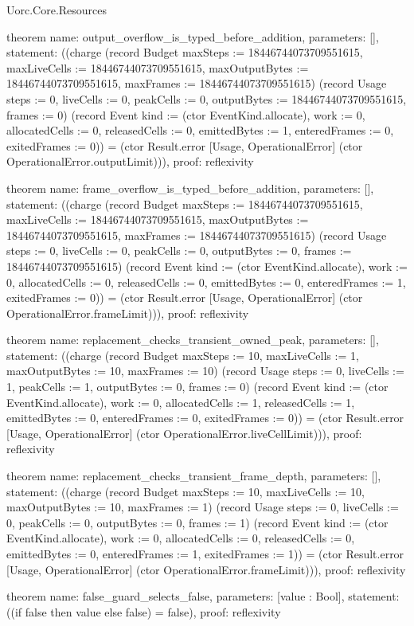 \begin{lexlean}{Uorc.Core.Resources}
\begin{semanticmodule}
theorem{
  name: output_overflow_is_typed_before_addition,
  parameters: [],
  statement: ((charge (record Budget {maxSteps := 18446744073709551615, maxLiveCells := 18446744073709551615, maxOutputBytes := 18446744073709551615, maxFrames := 18446744073709551615}) (record Usage {steps := 0, liveCells := 0, peakCells := 0, outputBytes := 18446744073709551615, frames := 0}) (record Event {kind := (ctor EventKind.allocate), work := 0, allocatedCells := 0, releasedCells := 0, emittedBytes := 1, enteredFrames := 0, exitedFrames := 0})) = (ctor Result.error [Usage, OperationalError] (ctor OperationalError.outputLimit))),
  proof: reflexivity{}
}

theorem{
  name: frame_overflow_is_typed_before_addition,
  parameters: [],
  statement: ((charge (record Budget {maxSteps := 18446744073709551615, maxLiveCells := 18446744073709551615, maxOutputBytes := 18446744073709551615, maxFrames := 18446744073709551615}) (record Usage {steps := 0, liveCells := 0, peakCells := 0, outputBytes := 0, frames := 18446744073709551615}) (record Event {kind := (ctor EventKind.allocate), work := 0, allocatedCells := 0, releasedCells := 0, emittedBytes := 0, enteredFrames := 1, exitedFrames := 0})) = (ctor Result.error [Usage, OperationalError] (ctor OperationalError.frameLimit))),
  proof: reflexivity{}
}

theorem{
  name: replacement_checks_transient_owned_peak,
  parameters: [],
  statement: ((charge (record Budget {maxSteps := 10, maxLiveCells := 1, maxOutputBytes := 10, maxFrames := 10}) (record Usage {steps := 0, liveCells := 1, peakCells := 1, outputBytes := 0, frames := 0}) (record Event {kind := (ctor EventKind.allocate), work := 0, allocatedCells := 1, releasedCells := 1, emittedBytes := 0, enteredFrames := 0, exitedFrames := 0})) = (ctor Result.error [Usage, OperationalError] (ctor OperationalError.liveCellLimit))),
  proof: reflexivity{}
}

theorem{
  name: replacement_checks_transient_frame_depth,
  parameters: [],
  statement: ((charge (record Budget {maxSteps := 10, maxLiveCells := 10, maxOutputBytes := 10, maxFrames := 1}) (record Usage {steps := 0, liveCells := 0, peakCells := 0, outputBytes := 0, frames := 1}) (record Event {kind := (ctor EventKind.allocate), work := 0, allocatedCells := 0, releasedCells := 0, emittedBytes := 0, enteredFrames := 1, exitedFrames := 1})) = (ctor Result.error [Usage, OperationalError] (ctor OperationalError.frameLimit))),
  proof: reflexivity{}
}

theorem{
  name: false_guard_selects_false,
  parameters: [value : Bool],
  statement: ((if false then value else false) = false),
  proof: reflexivity{}
}


\end{semanticmodule}
\end{lexlean}

